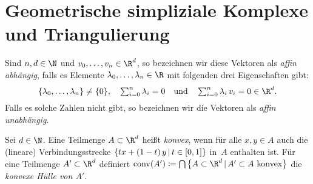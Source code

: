 \section{Geometrische simpliziale Komplexe und Triangulierung}
\begin{thDef}
    Sind $n,d\in\N$ und $v_0,\ldots,v_n\in\R^d$, so bezeichnen wir diese
    Vektoren als \emph{affin abhängig}, falls es Elemente
    $\lambda_0,\ldots,\lambda_n \in\R$ mit folgenden drei Eigenschaften gibt:
    \[ \textstyle
        \{\lambda_0,\ldots,\lambda_n\} \neq \{0\}, \quad \isum^n \lambda_i = 0
        \qundq \isum^n \lambda_i\,v_i = 0 \in\R^d
    . \] 
    Falls es solche Zahlen nicht gibt, so bezeichnen wir die Vektoren als
    \emph{affin unabhängig}.
\end{thDef}

\begin{thDef}
    Sei $d\in\N$. Eine Teilmenge $A\subset\R^d$ heißt \emph{konvex}, wenn
    für alle $x,y\in A$ auch die (lineare) Verbindungsstrecke
    $\{ tx + (1-t)\,y \Mid t\in[0,1] \}$ in~$A$ enthalten ist.
    Für eine Teilmenge $A'\subset\R^d$ definiert
    $ \conv(A') \defeq 
        \bigcap \,\bigl\{ A\subset\R^d \Mid A'\subset A\text{ konvex} \bigr\}
    $
    die \emph{konvexe Hülle von $A'$}.
\end{thDef}

